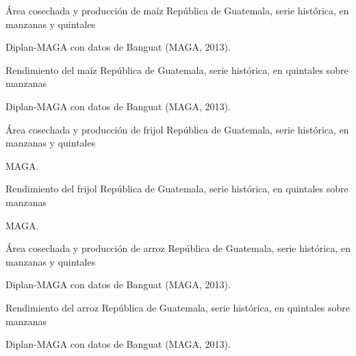 
{%
 }%
{%
 Área cosechada y producción de maíz} %
{%
 República de Guatemala, serie histórica, en manzanas y  quintales } %
{%
 \begin{tikzpicture}[x=1pt,y=1pt]    \end{tikzpicture}}%
{%
Diplan-MAGA con datos de Banguat (MAGA, 2013).} %



%
{%
}%
{%
	Rendimiento del maíz } %
{%
	República de Guatemala, serie histórica, en quintales sobre manzanas } %
{%
	\begin{tikzpicture}[x=1pt,y=1pt]    \end{tikzpicture}}%
{%
	Diplan-MAGA con datos de Banguat (MAGA, 2013).} %



%
{%
}%
{%
	Área cosechada y producción de frijol} %
{%
	República de Guatemala, serie histórica, en manzanas y  quintales } %
{%
	\begin{tikzpicture}[x=1pt,y=1pt]    \end{tikzpicture}}%
{%
	MAGA.} %


%
{%
}%
{%
	Rendimiento del frijol} %
{%
	República de Guatemala, serie histórica, en quintales sobre manzanas } %
{%
	\begin{tikzpicture}[x=1pt,y=1pt]    \end{tikzpicture}}%
{%
	MAGA.} %


%
{%
}%
{%
	Área cosechada y producción de arroz} %
{%
	República de Guatemala, serie histórica, en manzanas y  quintales } %
{%
	\begin{tikzpicture}[x=1pt,y=1pt]    \end{tikzpicture}}%
{%
	Diplan-MAGA con datos de Banguat (MAGA, 2013).} %



%
{%
}%
{%
	Rendimiento del arroz} %
{%
	República de Guatemala, serie histórica, en quintales sobre manzanas } %
{%
	\begin{tikzpicture}[x=1pt,y=1pt]    \end{tikzpicture}}%
{%
	Diplan-MAGA con datos de Banguat (MAGA, 2013).} %

